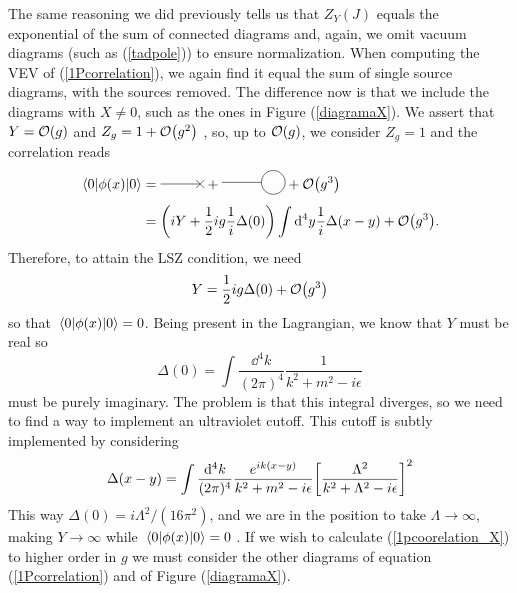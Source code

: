 The same reasoning we did previously tells us that $Z_Y(J)$ equals the exponential of the sum of connected diagrams and, again, we omit vacuum diagrams (such as (\ref{tadpole})) to ensure normalization. When computing the VEV of (\ref{1Pcorrelation}), we again find it equal the sum of single source diagrams, with the sources removed. The difference now is that we include the diagrams with $X\neq 0$, such as the ones in Figure (\ref{diagramaX}). We assert that $Y=\order{g}$ and $Z_g=1+\order{g^2}$ \cite{srednicki2007quantum}, so, up to $\order{g}$, we consider $Z_g=1$ and the correlation reads
\begin{equation}
\begin{aligned}
   \vev{\phi(x)}&=
   \begin{gathered}
    \begin{tikzpicture}
    \draw (0,0) -- (1,0);
    \draw (0.9,-0.1) -- (1.1, 0.1);
    \draw (0.9,0.1) -- (1.1, -0.1);
    \end{tikzpicture}
   \end{gathered}+
   \begin{gathered}
        \begin{tikzpicture}
        \draw (0,0) -- (1,0);
        \draw (1.3,0) circle [radius=0.3cm];
        \end{tikzpicture}
    \end{gathered}+\order{g^3}\\
   &=\qty(iY+\frac{1}{2}i g\frac{1}{i}\Delta(0))\int\dd^4y\frac{1}{i}\Delta(x-y)+\order{g^3}.
\end{aligned}
\end{equation}
Therefore, to attain the LSZ condition, we need
\begin{equation}
    Y=\frac{1}{2}ig\Delta(0)+\order{g^3}
    \label{1pcoorelation_X}
\end{equation}
so that $\vev{\phi(x)}=0$. Being present in the Lagrangian, we know that $Y$ must be real so 
\begin{equation}
    \Delta(0)=\int\frac{\dd^4k}{(2\pi)^4}\frac{1}{k^2+m^2-i\epsilon}
\end{equation}
must be purely imaginary. The problem  is that this integral diverges, so we need to find a way to implement an ultraviolet cutoff. This cutoff is subtly implemented by considering 
\begin{equation}
    \Delta(x-y)=\int\frac{\dd^4k}{(2\pi)^4}\frac{e^{ik(x-y)}}{k^2+m^2-i\epsilon}\qty[\frac{\Lambda^2}{k^2+\Lambda^2-i\epsilon}]^2
\end{equation}
This way $\Delta(0)=i\Lambda^2/(16\pi^2)$, and we are in the position to take $\Lambda\to\infty$, making $Y\to\infty$ while $\vev{\phi(x)}=0$ \cite{srednicki2007quantum}. If we wish to calculate (\ref{1pcoorelation_X}) to higher order in $g$ we must consider the other diagrams of equation (\ref{1Pcorrelation}) and of Figure (\ref{diagramaX}).

